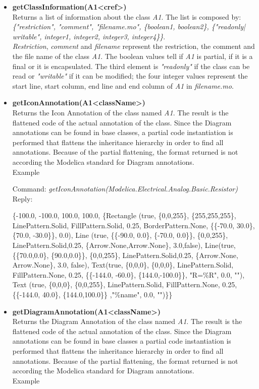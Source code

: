 \documentclass[11pt,a4paper,oneside,english]{book}
\newenvironment{modelicaExamples}{\begin{itemize}}{\end{itemize}}
\newcommand{\api}[2]{\item \textbf{#1} \\ #2}
\newcommand{\command}[1]{Command: \textit{#1}\\}
\newcommand{\reply}[1]{Reply: #1}
\newcommand{\functionex}[2]{\begin{singlespace} \command{#1} \reply{#2} \end{singlespace}}
\newcommand{\examples}{Example}
\begin{document}
\begin{modelicaExamples}
		\api{getClassInformation(A1<cref>)}{Returns a list of information about the class \textit{A1}. The list is composed by: \textit{\{"restriction", "comment", "filename.mo", \{boolean1, boolean2\}, \{"readonly| writable", integer1, integer2, integer3, integer4\}\}}.
		\\  \textit{Restriction}, \textit{comment} and \textit{filename} represent the restriction, the comment and the file name of the class \textit{A1}. The boolean values tell if \textit{A1} is partial, if it is a final or it is encapsulated. The third element is \textit{"readonly"} if the class can be read or \textit{"writable"} if it can be modified; the four integer values represent the start line, start column, end line and end column of \textit{A1} in \textit{filename.mo}.
		}

		\api{getIconAnnotation(A1<className>)}{Returns the Icon Annotation of the class named \textit{A1}. The result is the flattened code of the actual annotation of the class. Since the Diagram annotations can be found in base classes, a partial code instantiation is performed that flattens the inheritance hierarchy in order to find all annotations. Because of the partial flattening, the format returned is not according the Modelica standard for Diagram annotations.\\
		\examples

		\functionex{getIconAnnotation(Modelica.Electrical.Analog.Basic.Resistor)}
		{\begin{scriptsize}\{-100.0, -100.0, 100.0, 100.0, \{Rectangle (true, \{0,0,255\}, \{255,255,255\}, LinePattern.Solid, FillPattern.Solid, 0.25, BorderPattern.None, \{\{-70.0, 30.0\}, \{70.0, -30.0\}\}, 0.0), Line (true, \{\{-90.0, 0.0\}, \{-70.0, 0.0\}\}, \{0,0,255\}, LinePattern.Solid,0.25,
 \{Arrow.None,Arrow.None\}, 3.0,false), Line(true, \{\{70.0,0.0\}, \{90.0,0.0\}\},
 \{0,0,255\}, LinePattern.Solid,0.25, \{Arrow.None, Arrow.None\}, 3.0, false), Text(true, \{0,0,0\},
\{0,0,0\}, LinePattern.Solid, FillPattern.None, 0.25, \{\{-144.0, -60.0\},
\{144.0,-100.0\}\}, "R=\%R", 0.0, ""), Text (true,
\{0,0,0\}, \{0,0,255\}, LinePattern.Solid, FillPattern.None, 0.25, \{\{-144.0, 40.0\},
\{144.0,100.0\}\} ,"\%name", 0.0, "")\}\}
		\end{scriptsize}}
		}

		\api{getDiagramAnnotation(A1<className>)}{Returns the Diagram Annotation of the class named \textit{A1}. The result is the flattened code of the actual annotation of the class. Since the Diagram annotations can be found in base classes a partial code instantiation is performed that flattens the inheritance hierarchy in order to find all annotations. Because of the partial flattening, the format returned is not according the Modelica standard for Diagram annotations.\\
		\examples

}
\end{modelicaExamples}
\end{document}
